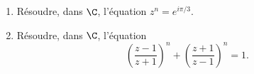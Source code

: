 \begin{enonce}
\begin{exercise}[ID={RMS133 E1393},subtitle={CCINP PC 2022},tags={},difficulty={}]
\begin{enumerate}
  \item Résoudre, dans $\C$, l'équation $z^n = e^{i\pi/3}$.
  \item Résoudre, dans $\C$, l'équation 
    \begin{equation*}
      \left( \frac{z-1}{z+1} \right)^n + \left( \frac{z+1}{z-1} \right)^n = 1.
    \end{equation*}
\end{enumerate}
\end{exercise}
\begin{solution}
\end{solution}
\end{enonce}
